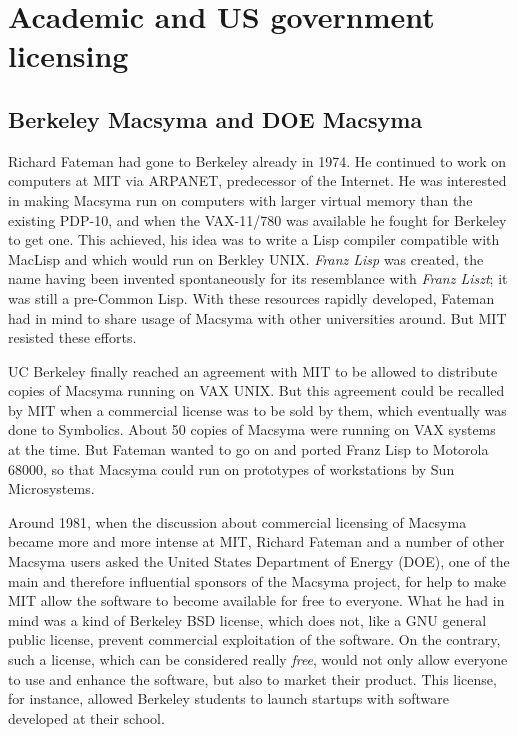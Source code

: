 \documentclass[../Maxima_Workbook.tex]{subfiles}
\begin{document}
\section{Academic and US government licensing}

\subsection{Berkeley Macsyma and DOE Macsyma}

Richard Fateman had gone to Berkeley already in 1974. He continued to work on computers at MIT via ARPANET, predecessor of the Internet. He was interested in making Macsyma run on computers with larger virtual memory than the existing PDP-10, and when the VAX-11/780 was available he fought for Berkeley to get one. This achieved, his idea was to write a Lisp compiler compatible with MacLisp and which would run on Berkley UNIX. \emph{Franz Lisp} was created, the name having been invented spontaneously for its resemblance with \emph{Franz Liszt}; it was still a pre-Common Lisp. With these resources rapidly developed, Fateman had in mind to share usage of Macsyma with other universities around. But MIT resisted these efforts.

\lz UC Berkeley finally reached an agreement with MIT to be allowed to distribute copies of Macsyma running on VAX UNIX. But this agreement could be recalled by MIT when a commercial license was to be sold by them, which eventually was done to Symbolics. About 50 copies of Macsyma were running on VAX systems at the time. But Fateman wanted to go on and ported Franz Lisp to Motorola 68000, so that Macsyma could run on prototypes of workstations by Sun Microsystems.

\lz Around 1981, when the discussion about commercial licensing of Macsyma became more and more intense at MIT, Richard Fateman and a number of other Macsyma users asked the United States Department of Energy (DOE), one of the main and therefore influential sponsors of the Macsyma project, for help to make MIT allow the software to become available for free to everyone. What he had in mind was a kind of Berkeley BSD license, which does not, like a GNU general public license, prevent commercial exploitation of the software. On the contrary, such a license, which can be considered really \emph{free}, would not only allow everyone to use and enhance the software, but also to market their product. This license, for instance, allowed Berkeley students to launch startups with software developed at their school.
\end{document}
